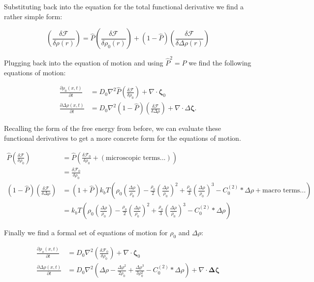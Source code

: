 \documentclass[11pt]{article}
\begin{document}
Substituting back into the equation for the total functional derivative we find a rather simple form: 

\begin{equation}
\left(\frac{\delta \mathcal{F}}{\delta \rho(r)}\right) = \hat{P}\left(\frac{\delta\mathcal{F}}{\delta \rho_0(r)}\right) + (1-\hat{P})\left(\frac{\delta \mathcal{F}}{\delta \Delta \rho(r)}\right)
\end{equation}

Plugging back into the equation of motion and using $\hat{P}^2 = \hat{P}$ we find the following equations of motion:

\begin{align}
\frac{\partial \rho_0(x,t)}{\partial t} &= D_0 \nabla^2 \hat{P} \left(\frac{\delta \mathcal{F}}{\delta \rho_0}\right) + \nabla \cdot \boldsymbol{\zeta}_0 \\
\frac{\partial \Delta \rho(x,t)}{\partial t} &= D_0 \nabla^2 \left(1-\hat{P}\right) \left(\frac{\delta \mathcal{F}}{\delta \Delta \rho}\right) + \nabla \cdot \Delta \boldsymbol{\zeta}.
\end{align}

Recalling the form of the free energy from before, we can evaluate these functional derivatives to get a more concrete form for the equations of motion. 

\begin{align}
\hat{P}\left(\frac{\delta \mathcal{F}}{\delta \rho_0}\right) &= \hat{P}\left(\frac{\delta \mathcal{F}_0}{\delta \rho_0} + (\mbox{microscopic terms...})\right) \nonumber \\
&= \frac{\delta \mathcal{F}_0}{\delta \rho_0} \\
\left(1 - \hat{P}\right) \left(\frac{\delta \mathcal{F}}{\delta \Delta \rho}\right) &= \left(1 + \hat{P}\right)k_bT\left(\rho_0\left(\frac{\Delta\rho}{\rho_0}\right) - \frac{\rho_0}{2}\left(\frac{\Delta\rho}{\rho_0}\right)^2+\frac{\rho_0}{3}\left(\frac{\Delta\rho}{\rho_0}\right)^3 - C^{(2)}_0 \ast \Delta\rho  + \mbox{macro terms...}\right) \nonumber \\
&= k_bT\left(\rho_0\left(\frac{\Delta\rho}{\rho_0}\right) - \frac{\rho_0}{2}\left(\frac{\Delta\rho}{\rho_0}\right)^2+\frac{\rho_0}{3}\left(\frac{\Delta\rho}{\rho_0}\right)^3 - C^{(2)}_0 \ast \Delta\rho \right)
\end{align}

Finally we find a formal set of equations of motion for $\rho_0$ and $\Delta \rho$:

\begin{align}
\frac{\partial \rho_o(x,t)}{\partial t} &= D_0 \nabla^2 \left(\frac{\delta \mathcal{F}_0}{\delta \rho_0}\right) + \nabla \cdot \boldsymbol \zeta_0 \\
\frac{\partial \Delta \rho (x, t)}{\partial t} &= D_0 \nabla^2 \left(\Delta \rho - \frac{\Delta \rho^2}{2\rho_0}  + \frac{\Delta \rho^3}{3\rho_0^2} - C^{(2)}_0\ast\Delta\rho\right) + \nabla \cdot \boldsymbol{\Delta\zeta}
\end{align}
\end{document}
